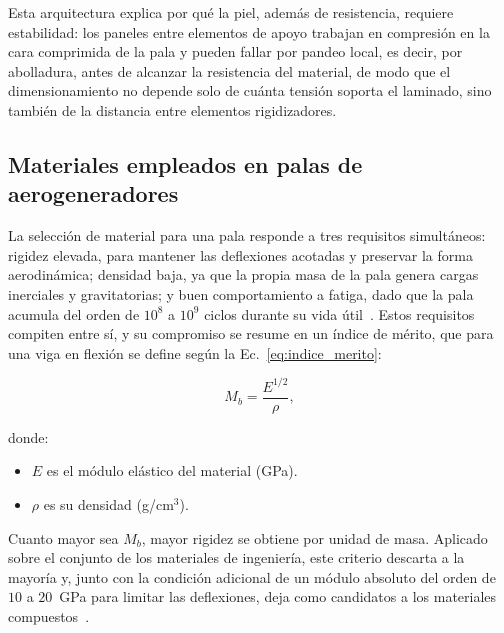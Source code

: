 Esta arquitectura explica por qué la piel, además de resistencia, requiere estabilidad: los paneles entre elementos de apoyo trabajan en compresión en la cara comprimida de la pala y pueden fallar por pandeo local, es decir, por abolladura, antes de alcanzar la resistencia del material, de modo que el dimensionamiento no depende solo de cuánta tensión soporta el laminado, sino también de la distancia entre elementos rigidizadores.

\subsection{Materiales empleados en palas de aerogeneradores}
\label{sec:materiales_palas}

La selección de material para una pala responde a tres requisitos simultáneos: rigidez elevada, para mantener las deflexiones acotadas y preservar la forma aerodinámica; densidad baja, ya que la propia masa de la pala genera cargas inerciales y gravitatorias; y buen comportamiento a fatiga, dado que la pala acumula del orden de $10^8$ a $10^9$ ciclos durante su vida útil~\parencite{Brondsted2005}. Estos requisitos compiten entre sí, y su compromiso se resume en un índice de mérito, que para una viga en flexión se define según la Ec.~\ref{eq:indice_merito}:

\begin{equation}
    M_b = \frac{E^{1/2}}{\rho},
    \label{eq:indice_merito}
\end{equation}

donde:
\begin{itemize}
    \item $E$ es el módulo elástico del material (GPa).
    \item $\rho$ es su densidad (g/cm$^3$).
\end{itemize}

Cuanto mayor sea $M_b$, mayor rigidez se obtiene por unidad de masa. Aplicado sobre el conjunto de los materiales de ingeniería, este criterio descarta a la mayoría y, junto con la condición adicional de un módulo absoluto del orden de $10$ a $20$~GPa para limitar las deflexiones, deja como candidatos a los materiales compuestos~\parencite{Brondsted2005}.

